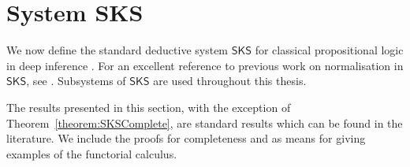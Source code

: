 \newcommand{\SKS}{\mathsf{SKS}}

\section{System SKS}


We now define the standard deductive system $\SKS$\index{$\SKS$} for classical propositional logic in deep inference  \cite{Brun:03:Atomic-C:oz,Brun:06:Cut-Elim:cq,Brun:06:Locality:zh,BrunTiu:01:A-Local-:mz}. For an excellent reference to previous work on normalisation in $\SKS$, see \cite{Brun:04:Deep-Inf:rq}. Subsystems of $\SKS$ are used throughout this thesis.

The results presented in this section, with the exception of Theorem~\vref{theorem:SKSComplete}, are standard results which can be found in the literature. We include the proofs for completeness and as means for giving examples of the functorial calculus.

\newcommand{\ai   }{{\mathsf{ai}}}
\newcommand{\aw   }{{\mathsf{aw}}}
\newcommand{\ac   }{{\mathsf{ac}}}
\newcommand{\aid  }{{\ai{\downarrow}}}
\newcommand{\awd  }{{\aw{\downarrow}}}
\newcommand{\acd  }{{\ac{\downarrow}}}
\newcommand{\aiu  }{{\ai{\uparrow}}}
\newcommand{\awu  }{{\aw{\uparrow}}}
\newcommand{\acu  }{{\ac{\uparrow}}}
\newcommand{\swi  }{\mathsf{s}}
\newcommand{\med  }{\mathsf{m}}
\newcommand{\asor }{{=_\mathsf{a}{\downarrow}}}
\newcommand{\asand}{{=_\mathsf{a}{\uparrow}}}
\newcommand{\coor }{{=_{\vee\mathsf{c}}}}
\newcommand{\coand}{{=_{\wedge\mathsf{c}}}}
\newcommand{\fffd }{{{=_{\fff}}{\downarrow}}}
\newcommand{\fffu }{{{=_{\fff}}{\uparrow}}}
\newcommand{\tttd }{{{=_{\ttt}}{\downarrow}}}
\newcommand{\tttu }{{{=_{\ttt}}{\uparrow}}}
\newcommand{\tttord }{{{=_{\ttt\vee}}{\downarrow}}}
\newcommand{\fffandd }{{{=_{\fff\wedge}}{\downarrow}}}
\newcommand{\tttoru }{{{=_{\ttt\vee}}{\uparrow}}}
\newcommand{\fffandu }{{{=_{\fff\wedge}}{\uparrow}}}


